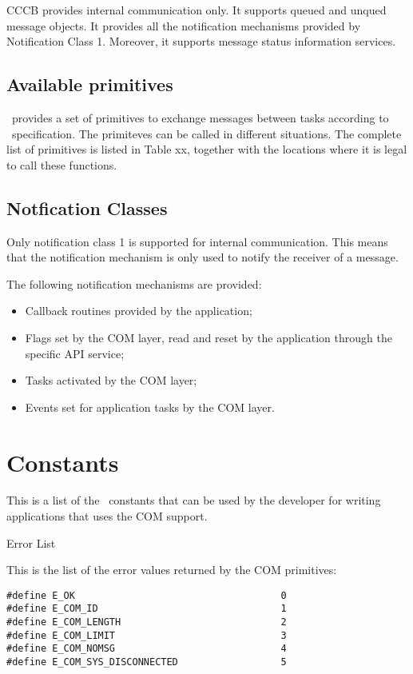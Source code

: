 CCCB provides internal communication only. It supports queued and unqued message 
objects. It provides all the notification mechanisms provided by Notification 
Class 1. Moreover, it supports message status information services.

\subsection{Available primitives}
\ee\ provides a set of primitives to exchange messages between tasks according to 
\oc\ specification. The primiteves can be called in different situations. 
The complete list of primitives is listed in Table xx, together with the 
locations where it is legal to call these functions.



\subsection{Notfication Classes}
Only notification class 1 is supported for internal communication. This means 
that the notification mechanism is only used to notify the receiver of a message.

The following notification mechanisms are provided:
\begin{itemize}
\item Callback routines provided by the application;
\item Flags set by the COM layer, read and reset by the application through 
the specific API service;
\item Tasks activated by the COM layer;
\item Events set for application tasks by the COM layer.
\end{itemize}


\pagebreak

\section{Constants}
\label{sec:constants}

This is a list of the \ee\ constants that can be used by the developer
for writing applications that uses the COM support.

\begin{constant}{Error List}
  \begin{constantdescription}
    This is the list of the error values returned by the COM primitives:
    \begin {lstlisting}
#define E_OK                                    0
#define E_COM_ID                                1
#define E_COM_LENGTH                            2
#define E_COM_LIMIT                             3
#define E_COM_NOMSG                             4
#define E_COM_SYS_DISCONNECTED                  5
    \end{lstlisting}
  \end{constantdescription}
\end{constant}

